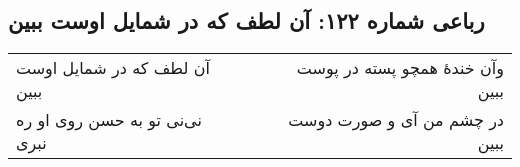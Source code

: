 \begin{center}
\section*{رباعی شماره ۱۲۲: آن لطف که در شمایل اوست ببین}
\label{sec:122}
\begin{longtable}{l p{0.5cm} r}
آن لطف که در شمایل اوست ببین
&&
وآن خندهٔ همچو پسته در پوست ببین
\\
نی‌نی تو به حسن روی او ره نبری
&&
در چشم من آی و صورت دوست ببین
\\
\end{longtable}
\end{center}
